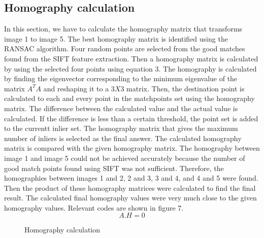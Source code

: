 \documentclass[10.5pt]{article}
\begin{document}
\begin{flushleft}
\subsection{Homography calculation}
In this section, we have to calculate the homography matrix that transforms image 1 to image 5. The best homography matrix is identified using the RANSAC algorithm. Four random points are selected from the good matches found from the SIFT feature extraction. Then a homography matrix is calculated by using the selected four points using equation 3. The homography is calculated by finding the eigenvector corresponding to the minimum eigenvalue of the matrix $A^{T}A$ and reshaping it to a $3 X 3$ matrix.
Then, the destination point is calculated to each and every point in the matchpoints set using the homography matrix. The difference between the calculated value and the actual value is calculated. If the difference is less than a certain threshold, the point set is added to the currentt inlier set. The homography matrix that gives the maximum number of inliers is selected as the final answer. The calculated homography matrix is compared with the given homography matrix. 
The homography between image 1 and image 5 could not be achieved accurately because the number of good match points found using SIFT was not sufficient. Therefore, the homographies between images 1 and 2, 2 and 3, 3 and 4, and 4 and 5 were found. Then the product of these homography matrices were calculated to find the final result. The calculated final homography values were very much close to the given homography values. Relevant codes are shown in figure 7.
\begin{equation}\label{Equation 3: hormography equation}
    A.H = 0
\end{equation}
\begin{figure}
    \centering
    \qquad
    \caption{Homography calculation}
    \label{fig:example}
\end{figure}




\end{flushleft}
\end{document}
